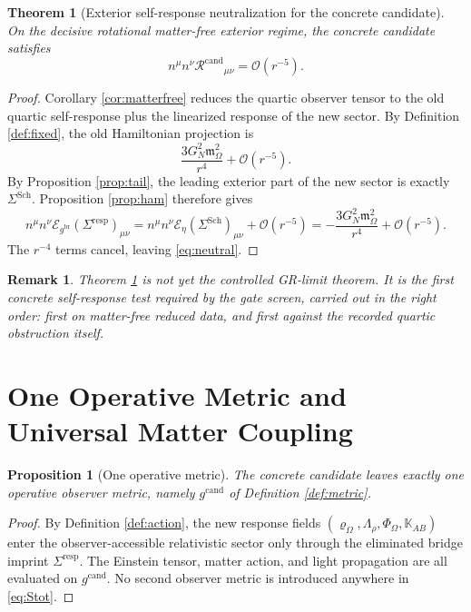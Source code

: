 \documentclass[11pt]{article}
\newcommand{\ObserverMetric}{g^{\mathrm{br}}}
\newcommand{\CandidateMetric}{g^{\mathrm{cand}}}
\newcommand{\ResponseShift}{\Sigma^{\mathrm{resp}}}
\newcommand{\ResponseShiftSch}{\Sigma^{\mathrm{Sch}}}
\newcommand{\AuxPol}{\mathbb K}
\newcommand{\FlowPot}{\Phi_\Omega}
\newcommand{\SourceDensity}{\varrho_\Omega}
\newcommand{\SourceMult}{\Lambda_\rho}
\newcommand{\HamChargeOmega}{\mathfrak m_\Omega}
\newcommand{\ObserverRemCand}{\mathcal R^{\mathrm{cand}}}
\newcommand{\EinLin}{\mathcal E_{\ObserverMetric}}
\newcommand{\EinLinFlat}{\mathcal E_{\eta}}
\newtheorem{proposition}{Proposition}
\newtheorem{remark}{Remark}
\newtheorem{theorem}{Theorem}
\begin{document}
\begin{theorem}[Exterior self-response neutralization for the concrete candidate]
\label{thm:neutral}
On the decisive rotational matter-free exterior regime, the concrete candidate satisfies
\begin{equation}
n^\mu n^\nu \ObserverRemCand{}_{\mu\nu}
=
\mathcal O(r^{-5}).
\label{eq:neutral}
\end{equation}
\end{theorem}

\begin{proof}
Corollary \ref{cor:matterfree} reduces the quartic observer tensor to the old quartic self-response plus the linearized response of the new sector. By Definition \ref{def:fixed}, the old Hamiltonian projection is
\[
\frac{3G_N^2\HamChargeOmega^2}{r^4}
+\mathcal O(r^{-5}).
\]
By Proposition \ref{prop:tail}, the leading exterior part of the new sector is exactly \(\ResponseShiftSch\). Proposition \ref{prop:ham} therefore gives
\[
n^\mu n^\nu \EinLin(\ResponseShift)_{\mu\nu}
=
n^\mu n^\nu \EinLinFlat(\ResponseShiftSch)_{\mu\nu}
+\mathcal O(r^{-5})
=
-\frac{3G_N^2\HamChargeOmega^2}{r^4}
+\mathcal O(r^{-5}).
\]
The \(r^{-4}\) terms cancel, leaving \eqref{eq:neutral}.
\end{proof}

\begin{remark}
Theorem \ref{thm:neutral} is not yet the controlled GR-limit theorem. It is the first concrete self-response test required by the gate screen, carried out in the right order: first on matter-free reduced data, and first against the recorded quartic obstruction itself.
\end{remark}

\section{One Operative Metric and Universal Matter Coupling}

\begin{proposition}[One operative metric]
\label{prop:onemetric}
The concrete candidate leaves exactly one operative observer metric, namely \(\CandidateMetric\) of Definition \ref{def:metric}.
\end{proposition}

\begin{proof}
By Definition \ref{def:action}, the new response fields \((\SourceDensity,\SourceMult,\FlowPot,\AuxPol_{AB})\) enter the observer-accessible relativistic sector only through the eliminated bridge imprint \(\ResponseShift\). The Einstein tensor, matter action, and light propagation are all evaluated on \(\CandidateMetric\). No second observer metric is introduced anywhere in \eqref{eq:Stot}.
\end{proof}
\end{document}

